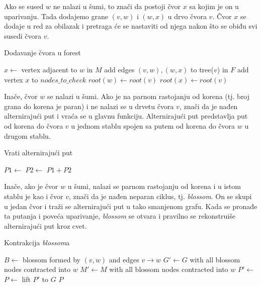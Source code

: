 \documentclass[11pt,a4paper]{article}
\theoremstyle{definition}
\begin{document}
\newpage

Ako se sused $w$ ne nalazi u šumi, to znači da postoji čvor $x$ sa kojim je on u uparivanju. Tada dodajemo grane $(v,w)$ i $(w,x)$ u drvo čvora $v$. Čvor $x$ se dodaje u red za obilazak i pretraga će se nastaviti od njega nakon što se obiđu svi susedi čvora $v$.

\begin{algorithm}[H]
\caption{Dodavanje čvora u forest}
\begin{algorithmic}
    \State $x \gets$ vertex adjacent to $w$ in $M$
    \State add edges $(v, w), (w, x)$ to tree($v$) in $F$
    \State add vertex $x$ to $nodes\_to\_check$
    \State $root(w) \gets root(v)$
    \State $root(x) \gets root(v)$
\EndFunction
\end{algorithmic}
\end{algorithm}

Inače, čvor $w$ se nalazi u šumi. Ako je na parnom rastojanju od korena (tj. broj grana do korena je paran) i ne nalazi se u drvetu čvora $v$, znači da je nađen alternirajući put i vraća se u glavnu funkciju. Alternirajući put predstavlja put od korena do čvora $v$ u jednom stablu spojen sa putem od korena do čvora $w$ u drugom stablu.

\begin{algorithm}[H]
\caption{Vrati alternirajući put}
\begin{algorithmic}
    \State $P1 \gets$ 
    \State $P2 \gets$ 
    \State \Return $P1 + P2$
\EndProcedure
\end{algorithmic}
\end{algorithm}

Inače, ako je čvor $w$ u šumi, nalazi se parnom rastojanju od korena i u istom stablu je kao i čvor $v$, znači da je nađen neparan ciklus, tj. \textit{blossom}. On se skupi u jedan čvor i traži se alternirajući put u tako smanjenom grafu. Kada se pronađe ta putanja i poveća uparivanje, \textit{blossom} se otvara i pravilno se rekonstruiše alternirajući put kroz cvet.

\begin{algorithm}[H]
\caption{Kontrakcija \textit{blossom}a}
\begin{algorithmic}
    \State $B \gets$ blossom formed by $(v,w)$ and edges $v \rightarrow w$
    \State $G' \gets G$ with all blossom nodes contracted into $w$
    \State $M' \gets M$ with all blossom nodes contracted into $w$
    \State $P' \gets$ 
    \State $P \gets$ lift $P'$ to $G$
    \State \Return $P$
\EndFunction
\end{algorithmic}
\end{algorithm}
\end{document}

